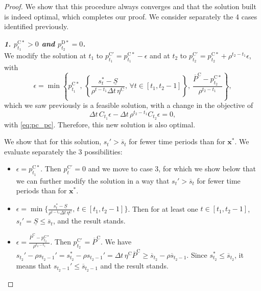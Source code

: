 \documentclass[10pt,a4paper]{amsart}
\newcommand{\up}[1]{^{\mathrm{#1}}}
\begin{document}
\begin{proof}
    We show that this procedure always converges and that the solution built is indeed optimal, which completes our proof.
    We consider separately the 4 cases identified previously.

    \textit{\textbf{1. $p_{t_1}\up{C*}>0$ and $p_{t_2}\up{D*}=0$.}} \\
    We modify the solution at $t_1$ to ${p}\up{C'}_{t_1}={p}\up{C*}_{t_1}-{\epsilon}$ and at $t_2$ to ${p}\up{C'}_{t_2}={p}\up{C*}_{t_2}+\rho^{t_2 - t_1} \epsilon$, with
    \begin{equation} \label{eq:epsilon_1}
        \epsilon = \min \left\{ {p}\up{C*}_{t_1}, \, \left\{\frac{{s}_t^* - \underline{S}}{\rho^{t - t_1} \Delta t \, \eta\up{C}}, \, \forall t \in [t_1,t_2-1]\right\}, \, \frac{\overline{P}\up{C} - p\up{C*}_{t_2}}{\rho^{t_2 - t_1}} \right\},
    \end{equation}
    which we saw previously is a feasible solution, with a change in the objective of
    \begin{equation}
        \Delta t \, C_{t_1} \epsilon - \Delta t \, \rho^{t_2 - t_1} C_{t_2} \epsilon = 0,
    \end{equation}
    with \eqref{eq:pc_pc}. Therefore, this new solution is also optimal.
    
    We show that for this solution, $s_t' > \overline{s}_t$ for fewer time periods than for $\mathbf{x}^*$.
    We evaluate separately the 3 possibilities:
    \begin{itemize}
        \item ${\epsilon} = {p}\up{C*}_{t_1}$. Then $p\up{C'}_t = 0$ and we move to case 3, for which we show below that we can further modify the solution in a way that $s_t' > \overline{s}_t$ for fewer time periods than for $\mathbf{x}^*$.
        \item ${\epsilon} = \min \{ \frac{s_t^* - \underline{S}}{\rho^{t - t_1} \Delta t \, \eta\up{C}}, \, t \in [t_1, t_2-1] \}$. Then for at least one $t \in [t_1, t_2-1]$, $s_t'= \underline{S} \leq \overline{s}_t$, and the result stands.
        \item ${\epsilon} = \frac{\overline{P}\up{C} - p\up{C*}_{t_2}}{\rho^{t_2 - t_1}}$. Then ${p}\up{C'}_{t_2} = \overline{P}\up{C}$. We have $s_{t_2}'- \rho s_{t_2-1}' = s_{t_2}^* - \rho  s_{t_2-1}' = \Delta t \, \eta\up{C} \overline{P}\up{C} \geq \overline{s}_{t_2} - \rho \overline{s}_{t_2-1}$. Since $s_{t_2}^* \leq \overline{s}_{t_2}$, it means that $s_{t_2-1}' \leq \overline{s}_{t_2-1}$ and the result stands.
    \end{itemize}


\end{proof}
\end{document}

